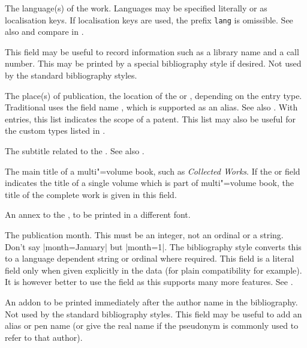 \documentclass{ltxdockit}[2011/03/25]
\begin{document}
\begin{fieldlist}

The language(s) of the work. Languages may be specified literally or as localisation keys. If localisation keys are used, the prefix \texttt{lang} is omissible. See also  and compare  in .


This field may be useful to record information such as a library name and a call number. This may be printed by a special bibliography style if desired. Not used by the standard bibliography styles.


The place(s) of publication, \ie the location of the  or , depending on the entry type. Traditional \bibtex uses the field name , which is supported as an alias. See also . With  entries, this list indicates the scope of a patent. This list may also be useful for the custom types listed in .


The subtitle related to the . See also .


The main title of a multi"=volume book, such as \emph{Collected Works}. If the  or  field indicates the title of a single volume which is part of multi"=volume book, the title of the complete work is given in this field.


An annex to the , to be printed in a different font.


The publication month. This must be an integer, not an ordinal or a string. Don't say |month={January}| but |month={1}|. The bibliography style converts this to a language dependent string or ordinal where required. This field is a literal field only when given
explicitly in the data (for plain \bibtex compatibility for example). It is
however better to use the  field as this supports many more features. See .


An addon to be printed immediately after the author name in the bibliography. Not used by the standard bibliography styles. This field may be useful to add an alias or pen name (or give the real name if the pseudonym is commonly used to refer to that author).


\end{fieldlist}
\end{document}
